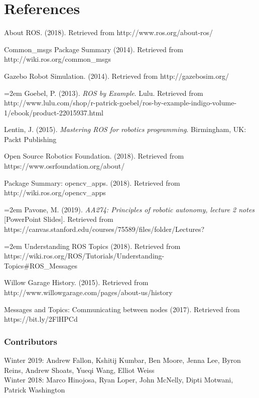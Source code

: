 \documentclass[twoside]{article}
\begin{document}
\section{References}\label{sec:bib}
About ROS. (2018). Retrieved from http://www.ros.org/about-ros/

Common\_msgs Package Summary (2014). Retrieved from http://wiki.ros.org/common\_msgs

Gazebo Robot Simulation. (2014). Retrieved from http://gazebosim.org/

\hangindent=2em
Goebel, P. (2013). \textit{ROS by Example}. Lulu. Retrieved from http://www.lulu.com/shop/r-patrick-goebel/ros-by-example-indigo-volume-1/ebook/product-22015937.html

Lentin, J. (2015). {\it Mastering ROS for robotics programming}. Birmingham, UK: Packt Publishing

Open Source Robotics Foundation. (2018). Retrieved from https://www.osrfoundation.org/about/

Package Summary: opencv\_apps. (2018). Retrieved from http://wiki.ros.org/opencv\_apps

\hangindent=2em
Pavone, M. (2019). {\it AA274: Principles of robotic autonomy, lecture 2 notes} [PowerPoint Slides]. Retrieved from https://canvas.stanford.edu/courses/75589/files/folder/Lectures?

\hangindent=2em
Understanding ROS Topics (2018). Retrieved from https://wiki.ros.org/ROS/Tutorials/Understanding-\\Topics\#ROS\_Messages

Willow Garage History. (2015). Retrieved from http://www.willowgarage.com/pages/about-us/history

Messages and Topics: Communicating between nodes (2017). Retrieved from https://bit.ly/2FlHPCd


\subsubsection{Contributors}
Winter 2019: Andrew Fallon, Kshitij Kumbar, Ben Moore, Jenna Lee, Byron Reins, Andrew Shoats, Yueqi Wang, Elliot Weiss \\
Winter 2018: Marco Hinojosa, Ryan Loper, John McNelly, Dipti Motwani, Patrick Washington
\end{document}
